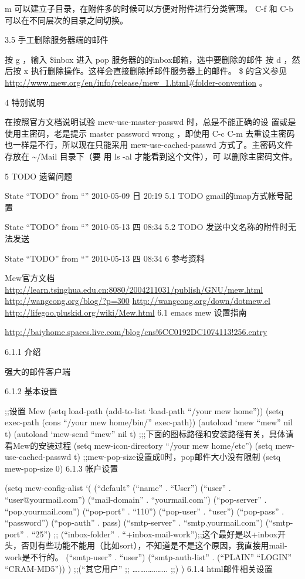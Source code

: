 \documentclass[11pt]{article}
\begin{document}
m 可以建立子目录，在附件多的时候可以方便对附件进行分类管理。 C-f 和 C-b 可以在不同层次的目录之间切换。

3.5 手工删除服务器端的邮件

按 g ，输入 \$inbox 进入 pop 服务器的的inbox邮箱，选中要删除的邮件 按 d ，然后按 x 执行删除操作。这样会直接删除掉邮件服务器上的邮件。 \$ 的含义参见 \href{http://www.mew.org/en/info/release/mew_1.html#folder-convention}{http://www.mew.org/en/info/release/mew\_1.html\#folder-convention} 。

4 特别说明

在按照官方文档说明试验 mew-use-master-passwd 时，总是不能正确的设 置或是使用主密码，老是提示 master password wrong ，即使用 C-c C-m 去重设主密码也一样是不行，所以现在只能采用 mew-use-cached-passwd 方式了。主密码文件存放在 \~{}/Mail 目录下（要 用 ls -al 才能看到这个文件），可 以删除主密码文件。

5 TODO 遗留问题

State ``TODO'' from ``'' 2010-05-09 日 20:19
5.1 TODO gmail的imap方式帐号配置

State ``TODO'' from ``'' 2010-05-13 四 08:34
5.2 TODO 发送中文名称的附件时无法发送

State ``TODO'' from ``'' 2010-05-13 四 08:34
6 参考资料

Mew官方文档
\href{http://learn.tsinghua.edu.cn:8080/2004211031/publish/GNU/mew.html}{http://learn.tsinghua.edu.cn:8080/2004211031/publish/GNU/mew.html}
\href{http://wangcong.org/blog/?p=300}{http://wangcong.org/blog/?p=300}
\href{http://wangcong.org/down/dotmew.el}{http://wangcong.org/down/dotmew.el}
\href{http://lifegoo.pluskid.org/wiki/Mew.html}{http://lifegoo.pluskid.org/wiki/Mew.html}
6.1 emacs mew 设置指南

\href{http://baiyhome.spaces.live.com/blog/cns!6CC0192DC1074113!256.entry}{http://baiyhome.spaces.live.com/blog/cns!6CC0192DC1074113!256.entry}

6.1.1 介绍

强大的邮件客户端

6.1.2 基本设置

;;设置 Mew
(setq load-path (add-to-list `load-path ``/your mew home'')) (setq exec-path (cons ``/your mew home/bin/'' exec-path))
(autoload `mew ``mew'' nil t)
(autoload `mew-send ``mew'' nil t)
;;;下面的图标路径和安装路径有关，具体请看Mew的安装过程
(setq mew-icon-directory ``/your mew home/etc'')
(setq mew-use-cached-passwd t)
;;mew-pop-size设置成0时，pop邮件大小没有限制
(setq mew-pop-size 0)
6.1.3 帐户设置

(setq mew-config-alist
  `(
(``default''
 (``name''         .  ``User'')
 (``user''         .  ``user@yourmail.com'')
 (``mail-domain''  .  ``yourmail.com'')
 (``pop-server''   .  ``pop.yourmail.com'')
 (``pop-port''     .  ``110'')
 (``pop-user''     .  ``user'')
 (``pop-pass''     .  ``password'')
 (``pop-auth''     .  pass)
 (``smtp-server''  .  ``smtp.yourmail.com'')
 (``smtp-port''    .  ``25'')
;;   (``inbox-folder'' .  ``+inbox-mail-work'');;这个最好是以+inbox开头，否则有些功能不能用（比如sort），不知道是不是这个原因，我直接用mail-work是不行的。
 (``smtp-user''    .  ``user'')
 (``smtp-auth-list''  .  (``PLAIN'' ``LOGIN'' ``CRAM-MD5''))
 )
;;(``其它用户''
;;  \ldots{}.\ldots{}.\ldots{}.\ldots{}...
;;)
)
6.1.4 html邮件相关设置
\end{document}
